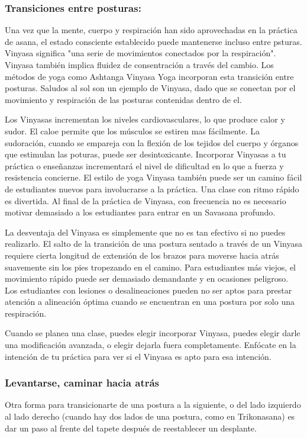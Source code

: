 \subsubsection{Transiciones entre posturas:}
Una vez que la mente, cuerpo y respiración han sido aprovechadas en la práctica de asana, el estado consciente establecido puede mantenerse incluso entre psturas. Vinyasa significa "una serie de movimientos conectados por la respiración". Vinyasa también implica fluidez de consentración a través del cambio. Los métodos de yoga como Ashtanga Vinyasa Yoga incorporan esta transición entre posturas. Saludos al sol son un ejemplo de Vinyasa, dado que se conectan por el movimiento y respiración de las posturas contenidas dentro de el.

Los Vinyasas incrementan los niveles cardiovasculares, lo que produce calor y sudor. El caloe permite que los músculos se estiren mas fácilmente. La sudoración, cuando se empareja con la flexión de los tejidos del cuerpo y órganos que estimulan las poturas, puede ser desintoxicante. Incorporar Vinyasas a tu práctica o enseñanzas incrementará el nivel de dificultad en lo que a fuerza y resistencia concierne. El estilo de yoga Vinyasa también puede ser un camino fácil de estudiantes nuevos para involucrarse a la práctica. Una clase con ritmo rápido es divertida. Al final de la práctica de Vinyasa, con frecuencia no es necesario motivar demasiado a los estudiantes para entrar en un Savasana profundo.

La desventaja del Vinyasa es simplemente que no es tan efectivo si no puedes realizarlo. El salto de la transición de una postura sentado a través de un Vinyasa requiere cierta longitud de extensión de los brazos para moverse hacia atrás suavemente sin los pies tropezando en el camino. Para estudiantes más viejos, el movimiento rápido puede ser demasiado demandante y en ocasiones peligroso. Los estudiantes con lesiones o desalineaciones pueden no ser aptos para prestar atención a alineación óptima cuando se encuentran en una postura por solo una respiración.

Cuando se planea una clase, puedes elegir incorporar Vinyasa, puedes elegir darle una modificación avanzada, o elegir dejarla fuera completamente. Enfócate en la intención de tu práctica para ver si el Vinyasa es apto para esa intención.

\subsubsection{Levantarse, caminar hacia atrás}
Otra forma para transicionarte de una postura a la siguiente, o del lado izquierdo al lado derecho (cuando hay dos lados de una postura, como en Trikonasana) es dar un paso al frente del tapete después de reestablecer un desplante.

